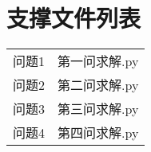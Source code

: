 \documentclass[withoutpreface,bwprint]{cumcmthesis} %
\begin{document}
\section{支撑文件列表}
\begin{center}
	\begin{tabular}{cc}
		\toprule[1.5pt]
		\makebox[0.2\textwidth][c]{题号}	&  \makebox[0.3\textwidth][c]{文件名称} \\
		\midrule[1pt]
		问题1	    	& 第一问求解.py   \\ 
	问题2    	& 第二问求解.py  \\ 
		问题3	    	& 第三问求解.py \\ 
		问题4	    	& 第四问求解.py  \\  

		\bottomrule[1.5pt]
	\end{tabular}
\end{center}
\end{document}
